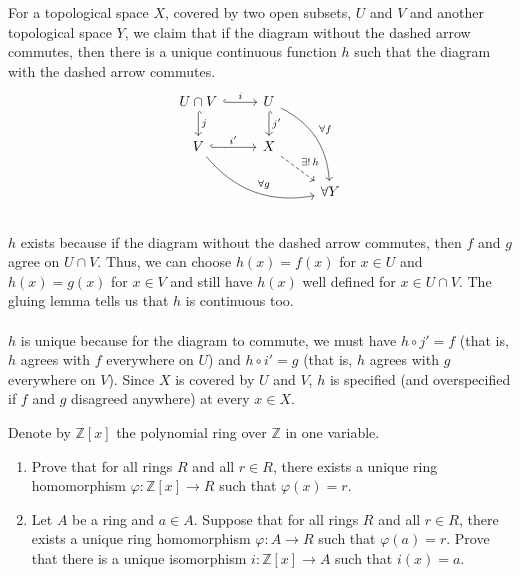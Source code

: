 \documentclass[letterpaper, 12pt]{hmcpset}
\begin{document}
\begin{solution}
	For a topological space $X$, covered by two open subsets, $U$ and $V$ and another topological space $Y$, we claim that if the diagram without the dashed arrow commutes, then there is a unique continuous function $h$ such that the diagram with the dashed arrow commutes.
	\[
		\begin{tikzcd}
			U \cap V \arrow[r, hook, "i"] \arrow[d, hook, "j"] & U \arrow[d, hook, "j'"] \arrow[ddr, bend left, "\forall f"] \\
			V \arrow[r, hook, "i'"] \arrow[drr, bend right, "\forall g"] & X \arrow[dr, dashrightarrow, "\exists ! \, h"] \\
						&&\forall Y
		\end{tikzcd}
	\]\\
	$h$ exists because if the diagram without the dashed arrow commutes, then $f$ and $g$ agree on $U \cap V$. Thus, we can choose $h(x) = f(x)$ for $x \in U$ and $h(x) = g(x)$ for $x \in V$ and still have $h(x)$ well defined for $x \in U \cap V$. The gluing lemma tells us that $h$ is continuous too. \\\\
	$h$ is unique because for the diagram to commute, we must have $h \circ j' = f$ (that is, $h$ agrees with $f$ everywhere on $U$) and $h \circ i' = g$ (that is, $h$ agrees with $g$ everywhere on $V$). Since $X$ is covered by $U$ and $V$, $h$ is specified (and overspecified if $f$ and $g$ disagreed anywhere) at every $x \in X$.
\end{solution}

\pagebreak

\begin{problem}[0.13]
	Denote by $\mathbb Z[x]$ the polynomial ring over $\mathbb Z$ in one variable.
	\begin{enumerate}
		\item Prove that for all rings $R$ and all $r \in R$, there exists a unique ring homomorphism $\varphi : \mathbb Z[x] \to R$ such that $\varphi(x) = r$.
		\item Let $A$ be a ring and $a \in A$. Suppose that for all rings $R$ and all $r \in R$, there exists a unique ring homomorphism $\varphi : A \to R$ such that $\varphi(a) = r$. Prove that there is a unique isomorphism $i : \mathbb Z[x] \to A$ such that $i(x) = a$.
	\end{enumerate}
\end{problem}
\end{document}
